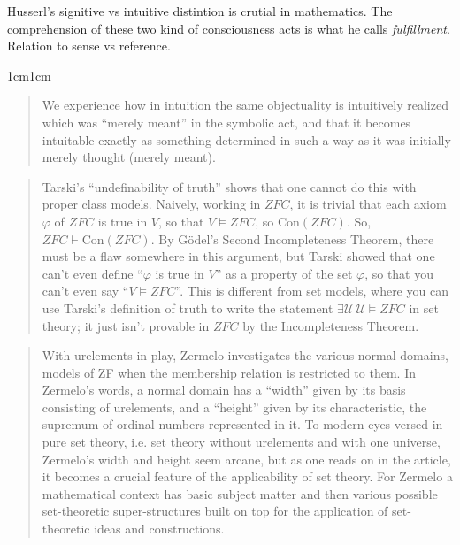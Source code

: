 \documentclass[11pt,a4paper]{book}
\theoremstyle{plain}
\begin{document}
Husserl's signitive vs intuitive distintion is crutial in mathematics. The comprehension of these two kind of consciousness acts is what he calls \textit{fulfillment}. Relation to sense vs reference.

\begin{adjustwidth}{1cm}{1cm}
  \small
  \begin{quote}
We experience how in intuition the same objectuality is intuitively realized which was “merely meant” in the symbolic act, and that it becomes intuitable exactly as something determined in such a way as it was initially merely thought (merely meant). \parencite[Part 2, §8]{Husserl1913}
  \end{quote}
\end{adjustwidth}

\begin{quote}
\small
Tarski's ``undefinability of truth'' shows that one cannot do this with proper class models. Naively, working in $ZFC$, it is trivial that each axiom $\varphi$ of $ZFC$ is true in $V$, so that $V \models ZFC$, so $\mathrm{Con}(ZFC)$. So, $ZFC \vdash \mathrm{Con}(ZFC)$. By Gödel's Second Incompleteness Theorem, there must be a flaw somewhere in this argument, but Tarski showed that one can't even define ``$\varphi$ is true in $V$'' as a property of the set $\varphi$, so that you can't even say ``$V \models ZFC$''. This is different from set models, where you can use Tarski's definition of truth to write the statement $\exists \mathcal{U}\ \mathcal{U} \models ZFC$ in set theory; it just isn't provable in $ZFC$ by the Incompleteness Theorem. \textcite[84]{Kunen2011}
\end{quote}

\begin{quote}
  \small
  With urelements in play, Zermelo investigates the various normal domains, models of ZF when the membership relation is restricted to them. In Zermelo’s words, a normal domain has a “width” given by its basis consisting of urelements, and a “height” given by its characteristic, the supremum of ordinal numbers represented in it. To modern eyes versed in pure set theory, i.e. set theory without urelements and with one universe, Zermelo’s width and height seem arcane, but as one reads on in the article, it becomes a crucial feature of the applicability of set theory. For Zermelo a mathematical context has basic subject matter and then various possible set-theoretic super-structures built on top for the application of set-theoretic ideas and constructions. \textcite[p. 392]{kanamori2010introduction}
\end{quote}



\printbibliography
\end{document}
